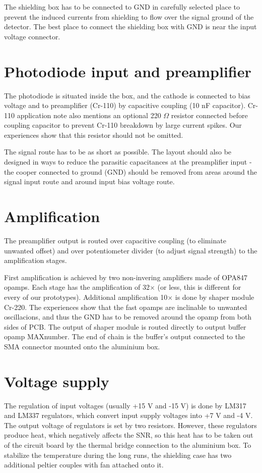 \par
The shielding box has to be connected to GND in carefully selected place to prevent the induced currents from shielding to flow over the signal ground of the detector. The best place to connect the shielding box with GND is near the input voltage connector.


\section{Photodiode input and preamplifier}
The photodiode is situated inside the box, and the cathode is connected to bias voltage and to preamplifier (Cr-110) by capacitive coupling (10 nF capacitor). Cr-110 application note also mentions an optional 220 $\Omega$ resistor connected before coupling capacitor to prevent Cr-110 breakdown by large current spikes. Our experiences show that this resistor should not be omitted.

\par
The signal route has to be as short as possible. The layout should also be designed in ways to reduce the parasitic capacitances at the preamplifier input - the cooper connected to ground (GND) should be removed from areas around the signal input route and around input bias voltage route. 

\section{Amplification}
The preamplifier output is routed over capacitive coupling (to eliminate unwanted offset) and over potentiometer divider (to adjust signal strength) to the amplification stages. 

First amplification is achieved by two non-invering amplifiers made of OPA847 opamps. Each stage has the amplification of 32$\times$ (or less, this is different for every of our prototypes). Additional amplification 10$\times$ is done by shaper module Cr-220. The experiences show that the fast opamps are inclinable to unwanted oscillacions, and thus the GND has to be removed around the opamp from both sides of PCB. The output of shaper module is routed directly to output buffer opamp MAXnumber. The end of chain is the buffer's output connected to the SMA connector mounted onto the aluminium box.

\par



\section{Voltage supply}
The regulation of input voltages (usually +15 V and -15 V) is done by LM317 and LM337 regulators, which convert input supply voltages into +7 V and -4 V. The output voltage of regulators is set by two resistors. However, these regulators produce heat, which negatively affects the SNR, so this heat has to be taken out of the circuit board by the thermal bridge connection to the aluminium box. To stabilize the temperature during the long runs, the shielding case has two additional peltier couples with fan attached onto it.

